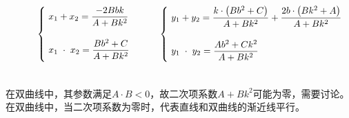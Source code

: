 \documentclass[UTF8]{ctexart}
\begin{document}
    \begin{large}
        \begin{equation*}
            ~~~~~~~~~~\begin{cases}
                ~x_1+x_2=\dfrac{-2Bbk}{A+Bk^2}\\[6mm]
                ~x_1\hspace{3.0pt}\cdot\hspace{3.0pt}x_2=\dfrac{Bb^2+C}{A+Bk^2}\\[2mm]
            \end{cases}~~~~~~
            \begin{cases}
                ~y_1+y_2=\dfrac{k\cdot\left(Bb^2+C\right)}{A+Bk^2}+\dfrac{2b\cdot\left(Bk^2+A\right)}{A+Bk^2}\\[6mm]
                ~y_1\hspace{3.0pt}\cdot\hspace{3.0pt}y_2=\dfrac{Ab^2+Ck^2}{A+Bk^2}\\[2mm]
            \end{cases}
        \end{equation*}
    \end{large}\\[3mm]
    在双曲线中，其参数满足$A\cdot B<0$，故二次项系数$A+Bk^2$可能为零，需要讨论。\\[3mm]
    在双曲线中，当二次项系数为零时，代表直线和双曲线的渐近线平行。
    
\newpage
\end{document}
